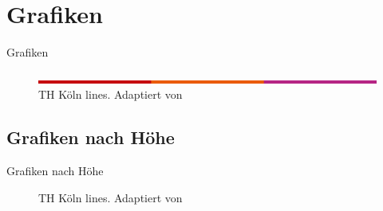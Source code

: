 \documentclass{beamer}
\begin{document}
\section{Grafiken}\label{sec:graphics}
\begin{frame}{Grafiken}
    \begin{figure}\label{thk-linien}
        \includegraphics[width=\textwidth]{./thk-lines.png}
        \caption[TH Köln lines]{TH Köln lines. Adaptiert von \cite{source}}
    \end{figure}
\end{frame}

\subsection{Grafiken nach Höhe}\label{sec:graphics_height}
\begin{frame}{Grafiken nach Höhe}
    \begin{figure}\label{thk-linien-hoch}
        \caption[TH Köln lines]{TH Köln lines. Adaptiert von \cite{source}}
    \end{figure}
\end{frame}
\end{document}

